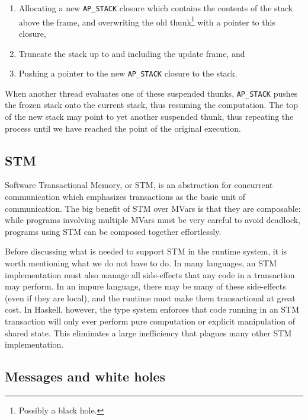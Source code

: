 \begin{enumerate}
    \item Allocating a new \verb|AP_STACK| closure which contains the
        contents of the stack above the frame, and overwriting the
        old thunk\footnote{Possibly a black hole.} with a pointer to this closure,
    \item Truncate the stack up to and including the update frame, and
    \item Pushing a pointer to the new \verb|AP_STACK| closure to the stack.
\end{enumerate}

When another thread evaluates one of these suspended thunks,
\verb|AP_STACK| pushes the frozen stack onto the current stack, thus
resuming the computation.  The top of the new stack may point to
yet another suspended thunk, thus repeating the process until we
have reached the point of the original execution. 

\subsection{STM}

Software Transactional Memory, or STM, is an abstraction for concurrent
communication which emphasizes transactions as the basic unit of
communication.  The big benefit of STM over MVars is that they are
composable: while programs involving multiple MVars must be very careful
to avoid deadlock, programs using STM can be composed together
effortlessly.

Before discussing what is needed to support STM in the runtime system,
it is worth mentioning what we do not have to do.  In many languages,
an STM implementation must also manage all side-effects that any code
in a transaction may perform.  In an impure language, there may be many
of these side-effects (even if they are local), and the runtime must
make them transactional at great cost.  In Haskell, however, the type system
enforces that code running in an STM transaction will only ever perform
pure computation or explicit manipulation of shared state.  This eliminates
a large inefficiency that plagues many other STM implementation.



\subsection{Messages and white holes}

